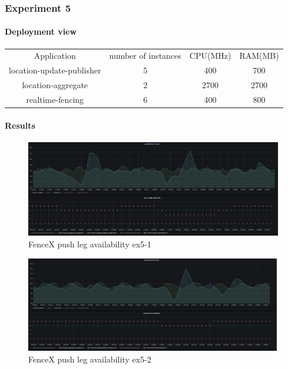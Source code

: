 \documentclass[a4]{report}
\begin{document}
        \clearpage

        \subsubsection{Experiment 5}

        \paragraph{Deployment view}
        \begin{center}
            \begin{tabular}{ c c c c }
                Application               & number of instances & CPU(MHz) & RAM(MB) \\
                location-update-publisher & 5                   & 400      & 700     \\
                location-aggregate        & 2                   & 2700     & 2700    \\
                realtime-fencing          & 6                   & 400      & 800     \\
            \end{tabular}
        \end{center}

        \paragraph{Results}
        \begin{figure}[ht]
            \caption{FenceX push leg availability ex5-1}
            \label{fig:ex5-1}
            \includegraphics[scale=0.4]{images/evaluation/ex5-benchmarking-ongoing-2per7sec.png}
        \end{figure}

        \begin{figure}[ht]
            \caption{FenceX push leg availability ex5-2}
            \label{fig:ex5-2}
            \includegraphics[scale=0.4]{images/evaluation/ex5-benchmarking-ongoing-2per6sec.png}
        \end{figure}
\end{document}

